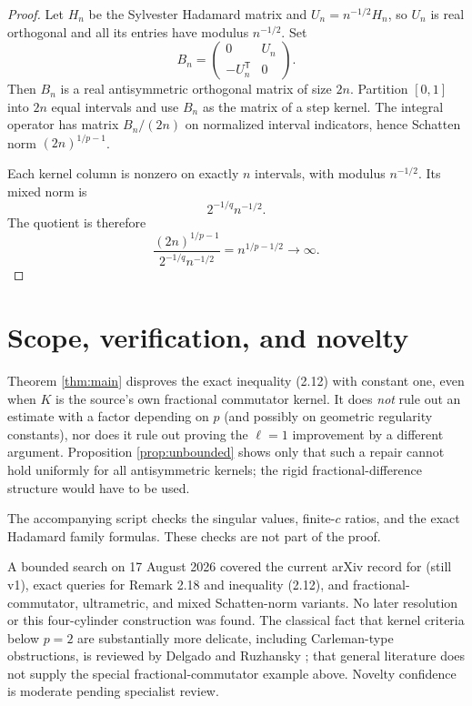 \documentclass[11pt]{article}
\begin{document}
\begin{proof}
Let $H_n$ be the Sylvester Hadamard matrix and $U_n=n^{-1/2}H_n$, so $U_n$ is
real orthogonal and all its entries have modulus $n^{-1/2}$.  Set
\[
 B_n=\begin{pmatrix}0&U_n\\-U_n^{\mathsf T}&0\end{pmatrix}.
\]
Then $B_n$ is a real antisymmetric orthogonal matrix of size $2n$.  Partition
$[0,1]$ into $2n$ equal intervals and use $B_n$ as the matrix of a step
kernel.  The integral operator has matrix $B_n/(2n)$ on normalized interval
indicators, hence Schatten norm $(2n)^{1/p-1}$.

Each kernel column is nonzero on exactly $n$ intervals, with modulus
$n^{-1/2}$.  Its mixed norm is
\[
 2^{-1/q}n^{-1/2}.
\]
The quotient is therefore
\[
 \frac{(2n)^{1/p-1}}{2^{-1/q}n^{-1/2}}
 =n^{1/p-1/2}\longrightarrow\infty.
\]
\end{proof}

\section{Scope, verification, and novelty}

Theorem \ref{thm:main} disproves the exact inequality (2.12) with constant
one, even when $K$ is the source's own fractional commutator kernel.  It does
\emph{not} rule out an estimate with a factor depending on $p$ (and possibly
on geometric regularity constants), nor does it rule out proving the
$\ell=1$ improvement by a different argument.  Proposition
\ref{prop:unbounded} shows only that such a repair cannot hold uniformly for
all antisymmetric kernels; the rigid fractional-difference structure would
have to be used.

The accompanying script checks the singular values, finite-$c$ ratios, and
the exact Hadamard family formulas.  These checks are not part of the proof.

A bounded search on 17 August 2026 covered the current arXiv record for
\cite{GM} (still v1), exact queries for Remark 2.18 and inequality (2.12), and
fractional-commutator, ultrametric, and mixed Schatten-norm variants.  No later
resolution or this four-cylinder construction was found.  The classical fact
that kernel criteria below $p=2$ are substantially more delicate, including
Carleman-type obstructions, is reviewed by Delgado and Ruzhansky
\cite{DR}; that general literature does not supply the special
fractional-commutator example above.  Novelty confidence is moderate pending
specialist review.
\end{document}
